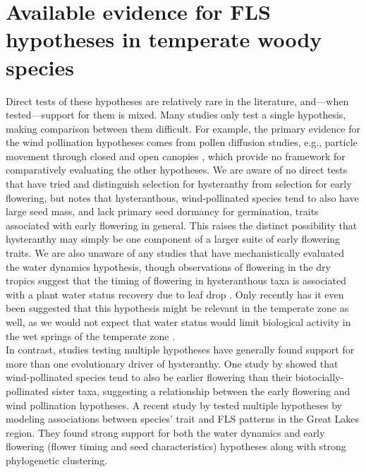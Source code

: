 \documentclass[12pt]{article}
\begin{document}
\section*{Available evidence for FLS hypotheses in temperate woody species} 
\indent\indent Direct tests of these hypotheses are relatively rare in the literature, and---when tested---support for them is mixed. Many studies only test a single hypothesis, making comparison between them difficult. For example, the primary evidence for the wind pollination hypotheses comes from pollen diffusion studies, e.g., particle movement through closed and open canopies \citep{Niklas1985,Nathan2005, Milleron2012}, which provide no framework for comparatively evaluating the other hypotheses. We are aware of no direct tests that have tried and distinguish selection for hysteranthy from selection for early flowering, but \citet{Primack1987} notes that hysteranthous, wind-pollinated species tend to also have large seed mass, and lack primary seed dormancy for germination, traits associated with early flowering in general. This raises the distinct possibility that hysteranthy may simply be one component of a larger suite of early flowering traits. We are also unaware of any studies that have mechanistically evaluated the water dynamics hypothesis, though observations of flowering in the dry tropics suggest that the timing of flowering in hysteranthous taxa is associated with a plant water status recovery due to leaf drop \citep{Borchert1983,Reich1984}. Only recently has it even been suggested that this hypothesis might be relevant in the temperate zone as well, as we would not expect that water status would limit biological activity in the wet springs of the temperate zone \citep{Gougherty2018}.\\

\indent In contrast, studies testing multiple hypotheses have generally found support for more than one evolutionary driver of hysteranthy. One study by \citet{Bolmgren2003} showed that wind-pollinated species tend to also be earlier flowering than their biotocially-pollinated sister taxa, suggesting a relationship between the early flowering and wind pollination hypotheses. A recent study by \citet{Gougherty2018} tested multiple hypotheses by modeling associations between species' trait and FLS patterns in the Great Lakes region. They found strong support for both the water dynamics and early flowering (flower timing and seed characteristics) hypotheses along with strong phylogenetic clustering. \\
\end{document}
